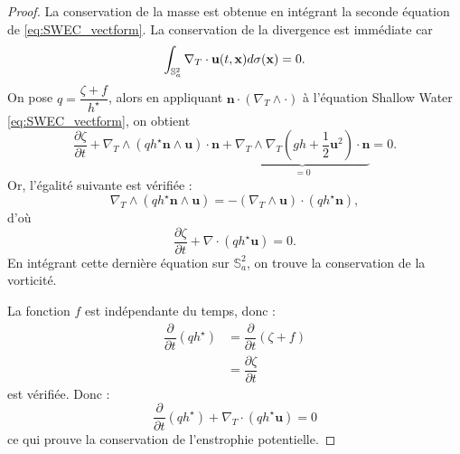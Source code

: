 \begin{proof}
La conservation de la masse est obtenue en intégrant la seconde équation de \eqref{eq:SWEC_vectform}.
La conservation de la divergence est immédiate car
\begin{equation}
\displaystyle\int_{\mathbb{S}_a^2} \nabla_T \cdot \mathbf{u}(t,\mathbf{x}) d \sigma(\mathbf{x}) = 0.
\end{equation}
On pose $q = \dfrac{\zeta + f}{h^{\star}}$, alors en appliquant $\mathbf{n} \cdot ( \nabla_T \wedge \cdot )$ à l'équation Shallow Water \eqref{eq:SWEC_vectform}, on obtient
\begin{equation}
\dfrac{\partial \zeta}{\partial t}+\nabla_T \wedge \left( q h^{\star} \mathbf{n} \wedge \mathbf{u} \right) \cdot\mathbf{n} + \underbrace{\nabla_T \wedge \nabla_T \left( gh + \dfrac{1}{2}\mathbf{u}^2 \right) \cdot \mathbf{n}}_{=0} = 0 .
\end{equation}
Or, l'égalité suivante est vérifiée :
\begin{equation}
\nabla_T \wedge (q h^{\star} \mathbf{n} \wedge \mathbf{u}) = - (\nabla_T \wedge \mathbf{u}) \cdot (q h^{\star} \mathbf{n}),
\end{equation}
d'où
\begin{equation}
\dfrac{ \partial \zeta}{\partial t} + \nabla \cdot \left( q h^{\star} \mathbf{u} \right) = 0.
\end{equation}
En intégrant cette dernière équation sur $\mathbb{S}_a^2$, on trouve la conservation de la vorticité.

La fonction $f$ est indépendante du temps, donc :
\begin{align*}
\dfrac{\partial}{\partial t} \left( qh^{\star} \right) & = \dfrac{\partial}{\partial t} ( \zeta + f) \\
& = \dfrac{\partial \zeta}{\partial t}
\end{align*}
est vérifiée. Donc :
\begin{equation}
\dfrac{\partial}{\partial t} \left( qh^{\star} \right) + \nabla_T \cdot \left( q h^{\star} \mathbf{u} \right) = 0
\end{equation}
ce qui prouve la conservation de l'enstrophie potentielle.


\end{proof}
